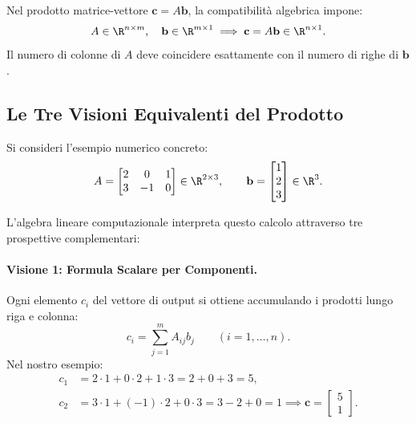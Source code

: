 Nel prodotto matrice-vettore $\mathbf{c} = A \mathbf{b}$, la compatibilità algebrica impone:
\begin{equation}
    A \in \R^{n \times m}, \quad \mathbf{b} \in \R^{m \times 1} \implies \mathbf{c} = A \mathbf{b} \in \R^{n \times 1}.
\end{equation}
Il numero di colonne di $A$ deve coincidere esattamente con il numero di righe di $\mathbf{b}$.

\subsection{Le Tre Visioni Equivalenti del Prodotto}

Si consideri l'esempio numerico concreto:
\begin{equation}
    A = \begin{bmatrix} 2 & 0 & 1 \\ 3 & -1 & 0 \end{bmatrix} \in \R^{2 \times 3}, \qquad \mathbf{b} = \begin{bmatrix} 1 \\ 2 \\ 3 \end{bmatrix} \in \R^3.
\end{equation}

L'algebra lineare computazionale interpreta questo calcolo attraverso tre prospettive complementari:

\paragraph{Visione 1: Formula Scalare per Componenti.}
Ogni elemento $c_i$ del vettore di output si ottiene accumulando i prodotti lungo riga e colonna:
\begin{equation}
    c_i = \sum_{j=1}^m A_{ij} b_j \qquad (i = 1, \dots, n).
\end{equation}
Nel nostro esempio:
\begin{align}
    c_1 &= 2 \cdot 1 + 0 \cdot 2 + 1 \cdot 3 = 2 + 0 + 3 = 5, \\
    c_2 &= 3 \cdot 1 + (-1) \cdot 2 + 0 \cdot 3 = 3 - 2 + 0 = 1 \implies \mathbf{c} = \begin{bmatrix} 5 \\ 1 \end{bmatrix}.
\end{align}

